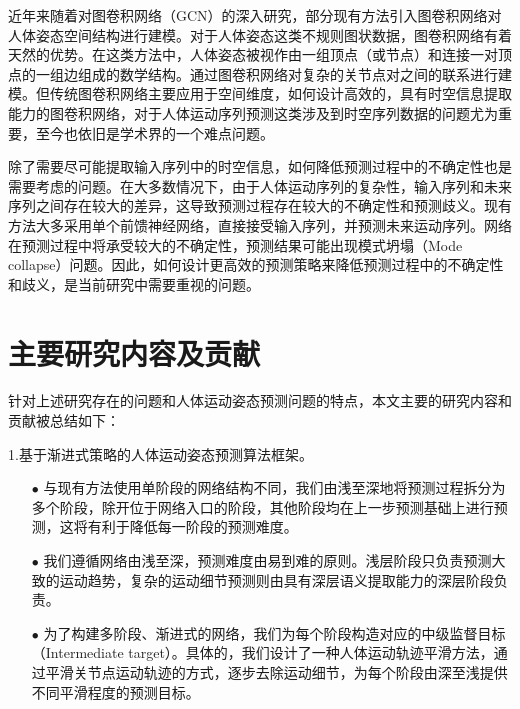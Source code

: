 近年来随着对图卷积网络（GCN\cite{kipf2016semi}）的深入研究，部分现有方法引入图卷积网络对人体姿态空间结构进行建模。对于人体姿态这类不规则图状数据，图卷积网络有着天然的优势。在这类方法中，人体姿态被视作由一组顶点（或节点）和连接一对顶点的一组边组成的数学结构。通过图卷积网络对复杂的关节点对之间的联系进行建模。但传统图卷积网络主要应用于空间维度，如何设计高效的，具有时空信息提取能力的图卷积网络，对于人体运动序列预测这类涉及到时空序列数据的问题尤为重要，至今也依旧是学术界的一个难点问题。

除了需要尽可能提取输入序列中的时空信息，如何降低预测过程中的不确定性也是需要考虑的问题。在大多数情况下，由于人体运动序列的复杂性，输入序列和未来序列之间存在较大的差异，这导致预测过程存在较大的不确定性和预测歧义。现有方法大多采用单个前馈神经网络，直接接受输入序列，并预测未来运动序列。网络在预测过程中将承受较大的不确定性，预测结果可能出现模式坍塌（Mode collapse）问题。因此，如何设计更高效的预测策略来降低预测过程中的不确定性和歧义，是当前研究中需要重视的问题。

\section{主要研究内容及贡献}
针对上述研究存在的问题和人体运动姿态预测问题的特点，本文主要的研究内容和贡献被总结如下：

1.基于渐进式策略的人体运动姿态预测算法框架。
\begin{enumerate}[topsep = 0 pt, itemsep= 0 pt, parsep=0pt, partopsep=0pt, leftmargin=44pt, itemindent=0pt, labelsep=6pt]
	\item[$\bullet$] 与现有方法使用单阶段的网络结构不同，我们由浅至深地将预测过程拆分为多个阶段，除开位于网络入口的阶段，其他阶段均在上一步预测基础上进行预测，这将有利于降低每一阶段的预测难度。
	\item[$\bullet$] 我们遵循网络由浅至深，预测难度由易到难的原则。浅层阶段只负责预测大致的运动趋势，复杂的运动细节预测则由具有深层语义提取能力的深层阶段负责。
	\item[$\bullet$] 为了构建多阶段、渐进式的网络，我们为每个阶段构造对应的中级监督目标（Intermediate target）。具体的，我们设计了一种人体运动轨迹平滑方法，通过平滑关节点运动轨迹的方式，逐步去除运动细节，为每个阶段由深至浅提供不同平滑程度的预测目标。
\end{enumerate}

